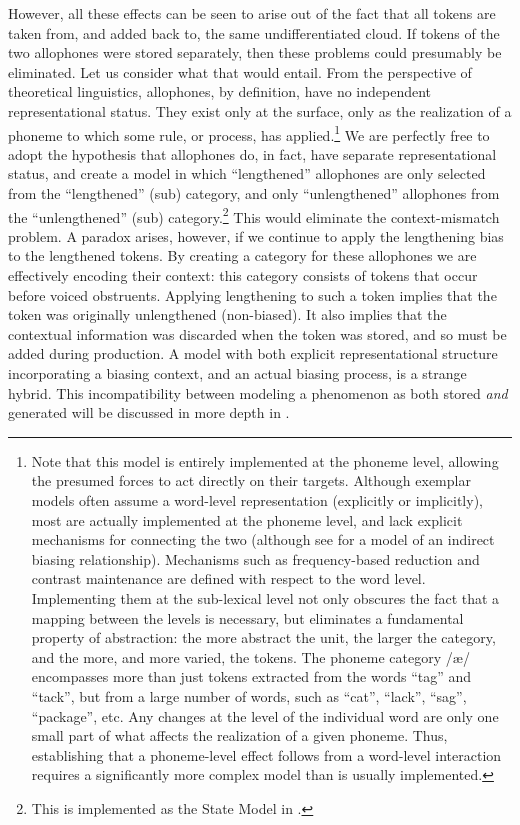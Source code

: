 However, all these effects can be seen to arise out of the fact that
all tokens are taken from, and added back to, the same undifferentiated
cloud. If tokens of the two allophones were stored separately, then
these problems could presumably be eliminated. Let us consider what
that would entail. From the perspective of theoretical linguistics,
allophones, by definition, have no independent representational status.
They exist only at the surface, only as the realization of a phoneme
to which some rule, or process, has applied.\footnote{Note that this model is entirely implemented at the phoneme level,
allowing the presumed forces to act directly on their targets. Although
exemplar models often assume a word-level representation (explicitly
or implicitly), most are actually implemented at the phoneme level,
and lack explicit mechanisms for connecting the two (although see
\citet{Wedel2008} for a model of an indirect biasing relationship).
Mechanisms such as frequency-based reduction and contrast maintenance
are defined with respect to the word level. Implementing them at the
sub-lexical level not only obscures the fact that a mapping between
the levels is necessary, but eliminates a fundamental property of
abstraction: the more abstract the unit, the larger the category,
and the more, and more varied, the tokens. The phoneme category {/æ/}
encompasses more than just tokens extracted from the words “tag”
and “tack”, but from a large number of words, such as “cat”,
“lack”, “sag”, “package”, etc. Any changes at the
level of the individual word are only one small part of what affects
the realization of a given phoneme. Thus, establishing that a phoneme-level
effect follows from a word-level interaction requires a significantly
more complex model than is usually implemented. } We are perfectly free to adopt the hypothesis that allophones do,
in fact, have separate representational status, and create a model
in which “lengthened” allophones are only selected from the
“lengthened” (sub) category, and only “unlengthened” allophones
from the “unlengthened” (sub) category.\footnote{This is implemented as the State Model in .}
This would eliminate the context-mismatch problem. A paradox arises,
however, if we continue to apply the lengthening bias to the lengthened
tokens. By creating a category for these allophones we are effectively
encoding their context: this category consists of tokens that occur
before voiced obstruents. Applying lengthening to such a token implies
that the token was originally unlengthened (non-biased). It also implies
that the contextual information was discarded when the token was stored,
and so must be added during production. A model with both explicit
representational structure incorporating a biasing context, and an
actual biasing process, is a strange hybrid. This incompatibility
between modeling a phenomenon as both stored \emph{and} generated
will be discussed in more depth in . 

